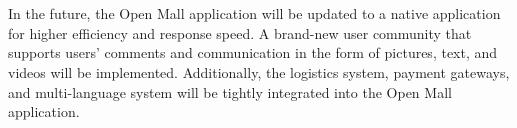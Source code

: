 \documentclass{article}
\begin{document}
\\\\
In the future, the Open Mall application will be updated to a native application for higher efficiency and response speed. A brand-new user community that supports users’ comments and communication in the form of pictures, text, and videos will be implemented. Additionally, the logistics system, payment gateways, and multi-language system will be tightly integrated into the Open Mall application. 


\clearpage

\renewcommand\listoflistingscaption{List of source codes}




\clearpage



\clearpage
\end{document}
